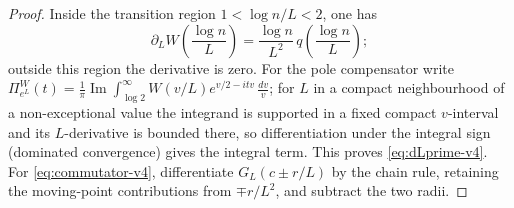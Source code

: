 \documentclass[11pt,a4paper]{article}
\numberwithin{equation}{section}
\theoremstyle{definition}
\theoremstyle{remark}
\begin{document}
\begin{proof}
Inside the transition region $1<\log n/L<2$, one has
\begin{equation}
\partial_L W\!\left(\frac{\log n}{L}\right)
=\frac{\log n}{L^2}\,q\!\left(\frac{\log n}{L}\right);
\end{equation}
outside this region the derivative is zero. For the pole compensator write
$\Pi_{e^L}^W(t)=\frac1\pi\operatorname{Im}\int_{\log2}^{\infty}W(v/L)e^{v/2-itv}\,\frac{dv}v$;
for $L$ in a compact neighbourhood of a non-exceptional value the
integrand is supported in a fixed compact $v$-interval and its
$L$-derivative is bounded there, so differentiation under the integral
sign (dominated convergence) gives the integral term. This proves \eqref{eq:dLprime-v4}.
For \eqref{eq:commutator-v4}, differentiate
$G_L(c\pm r/L)$ by the chain rule, retaining the moving-point
contributions from $\mp r/L^2$, and subtract the two radii.
\end{proof}

\end{document}
